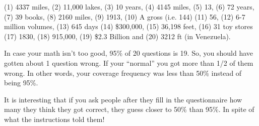 \documentclass[12pt]{extarticle}
\begin{document}
\newpage

(1) 4337 miles, (2) 11,000
  lakes, (3) 10 years, (4) 4145 miles, (5) 13, (6) 72 years, (7) 39
  books, (8) 2160 miles, (9) 1913, (10) A gross (i.e. 144) (11) 56,
  (12) 6-7 million volumes, (13) 645 days (14) \$300,000, (15) 36,198
  feet, (16) 31 toy stores (17) 1830, (18) 915,000, (19) \$2.3 Billion
  and (20) 3212 ft (in Venezuela).

  In case your math isn't too good, 95\% of 20 questions is 19.  So,
  you should have gotten about 1 question wrong.  If your ``normal''
  you got more than 1/2 of them wrong.  In other words, your coverage
  frequency was less than 50\% instead of being 95\%. 

  It is interesting that if you ask people after they fill in the
  questionnaire how many they think they got correct, they guess closer
  to 50\% than 95\%.  In spite of what the instructions told them!
\end{document}
